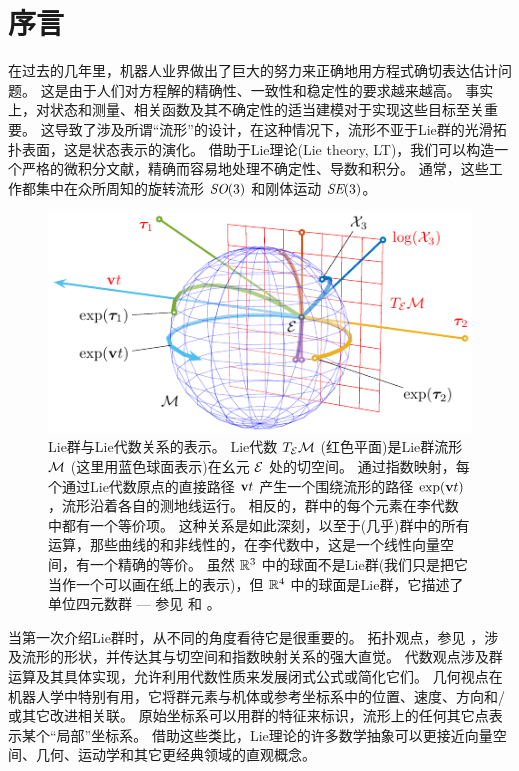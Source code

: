 
\section{序言}
\label{sec:intro}

在过去的几年里，机器人业界做出了巨大的努力来正确地用方程式确切表达估计问题。 
这是由于人们对方程解的精确性、一致性和稳定性的要求越来越高。 
事实上，对状态和测量、相关函数及其不确定性的适当建模对于实现这些目标至关重要。
这导致了涉及所谓“流形”的设计，在这种情况下，流形不亚于Lie群的光滑拓扑表面，这是状态表示的演化。
借助于Lie理论(Lie theory, LT)，我们可以构造一个严格的微积分文献，精确而容易地处理不确定性、导数和积分。
通常，这些工作都集中在众所周知的旋转流形 $\textit{SO}(3)$ 和刚体运动 $\textit{SE}(3)$。

\begin{figure}[tb]
\centering
\includegraphics{figures/exponential}
\caption{Lie群与Lie代数关系的表示。
Lie代数 $T_{\mathcal{E}}{\mathcal{M}}$ (红色平面)是Lie群流形 $\mathcal{M}$ (这里用蓝色球面表示)在幺元 $\mathcal{E}$ 处的切空间。
通过指数映射，每个通过Lie代数原点的直接路径 ${\bf v} t$ 产生一个围绕流形的路径 $\exp({\bf v} t)$ ，流形沿着各自的测地线运行。 
相反的，群中的每个元素在李代数中都有一个等价项。
这种关系是如此深刻，以至于(几乎)群中的所有运算，那些曲线的和非线性的，在李代数中，这是一个线性向量空间，有一个精确的等价。
虽然 ${\mathbb R}^3$ 中的球面不是Lie群(我们只是把它当作一个可以画在纸上的表示)，但 ${\mathbb R}^4$ 中的球面是Lie群，它描述了单位四元数群 --- 参见  和  。
}
\label{fig:exponential}
\end{figure}

当第一次介绍Lie群时，从不同的角度看待它是很重要的。 
拓扑观点，参见  ，涉及流形的形状，并传达其与切空间和指数映射关系的强大直觉。
代数观点涉及群运算及其具体实现，允许利用代数性质来发展闭式公式或简化它们。
几何视点在机器人学中特别有用，它将群元素与机体或参考坐标系中的位置、速度、方向和/或其它改进相关联。
原始坐标系可以用群的特征来标识，流形上的任何其它点表示某个“局部”坐标系。
借助这些类比，Lie理论的许多数学抽象可以更接近向量空间、几何、运动学和其它更经典领域的直观概念。


